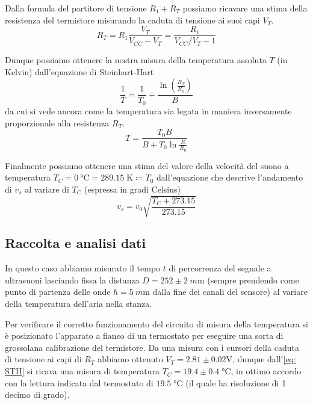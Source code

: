\documentclass[10pt, a4paper, italian]{article}
\begin{document}
Dalla formula del partitore di tensione $R_1 + R_T$ possiamo ricavare una
stima della resistenza del termistore misurando la caduta di tensione ai suoi
capi $V_T$.
\begin{equation}
R_T = R_1 \frac{V_T}{V_{CC} - V_T} = \frac{R_1}{V_{CC}/V_T - 1}
\end{equation}

Dunque possiamo ottenere la nostra misura della temperatura assoluta $T$
(in Kelvin) dall'equazione di Steinhart-Hart
\begin{equation}\label{eq: STH}
\frac{1}{T} = \frac{1}{T_0} + \frac{\ln{\left(\frac{R_T}{R_0}\right)}}{B}
\end{equation}
da cui si vede ancora come la temperatura sia legata in maniera inversamente
proporzionale alla resistenza $R_T$.
\begin{equation}
T = \frac{T_0 B}{B + T_0 \ln{\frac{R}{R_0}}}
\end{equation}

Finalmente possiamo ottenere una stima del valore della velocità del suono a
temperatura $T_C = \SI{0}{\degreeCelsius} = 289.15 \; \si{\K} \coloneq T_0$
dall'equazione che descrive l'andamento di $v_s$ al variare di $T_C$
(espressa in gradi Celsius)
\begin{equation}\label{eq: v(T)}
v_s = v_0 \sqrt{\frac{T_C + 273.15}{273.15}}
\end{equation}

\subsection{Raccolta e analisi dati}
In questo caso abbiamo misurato il tempo $t$ di percorrenza del segnale a
ultrasuoni lasciando fissa la distanza $D = 252 \pm 2 \; \si{m\m}$
(sempre prendendo come punto di partenza delle onde $h = \SI{5}{m\m}$ dalla
fine dei canali del sensore) al variare della temperatura dell'aria nella
stanza.

Per verificare il corretto funzionamento del circuito di misura della
temperatura si è posizionato l'apparato a fianco di un termostato per eseguire
una sorta di grossolana calibrazione del termistore.
Da una misura con i cursori della caduta di tensione ai capi di $R_T$ abbiamo
ottenuto $V_T = 2.81 \pm 0.02 \si{\V}$, dunque dall'\cref{eq: STH} si ricava
una misura di temperatura $T_C = 19.4 \pm 0.4 \; \si{\degreeCelsius}$, in
ottimo accordo con la lettura indicata dal termostato di
$19.5 \; \si{\degreeCelsius}$ (il quale ha risoluzione di 1 decimo di grado).
\end{document}
